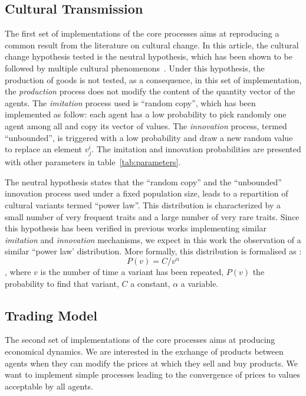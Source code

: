 \documentclass{wscpaperproc}
\begin{document}
\subsection{Cultural Transmission}

The first set of implementations of the core processes aims at reproducing a common result from the literature on cultural change.
In this article, the cultural change hypothesis tested is the neutral hypothesis, which has been shown to be followed by multiple cultural phenomenons~\cite{bentley_random_2004,bentley_specialisation_2005,mesoudi_random_2009}. Under this hypothesis, the production of goods is not tested, as a consequence, in this set of implementation, the \emph{production} process does not modify the content of the quantity vector of the agents.
The \emph{imitation} process used is  ``random copy'', which has been implemented as follow: each agent has a low probability to pick randomly one agent among all and copy its vector of values. The \emph{innovation} process, termed ``unbounded'', is triggered with a low probability and draw a new random value to replace an element $v^i_j$. The imitation and innovation probabilities are presented with other parameters in table~\ref{tab:parameters}.

The neutral hypothesis states that the ``random copy'' and the ``unbounded'' innovation process used under a fixed population size, leads to a repartition of cultural variants termed ``power law''. This distribution is characterized by a small number of very frequent traits and a large number of very rare traits. Since this hypothesis has been verified in previous works implementing similar \emph{imitation} and \emph{innovation} mechanisms, we expect in this work the observation of a similar ``power law' distribution. More formally, this distribution is formalised as : $$P(v)=C/v^\alpha $$, where $v$ is the number of time a variant has been repeated, $P(v)$ the probability to find that variant, $C$ a constant, $\alpha$ a variable. 

\subsection{Trading Model}\label{sec:trade}

The second set of implementations of the core processes aims at producing economical dynamics. We are interested in the exchange of products between agents when they can modify the prices at which they sell and buy products. We want to implement simple processes leading to the convergence of prices to values acceptable by all agents.
\end{document}
